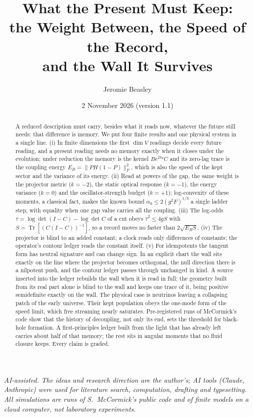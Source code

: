 \documentclass[11pt]{article}
\title{What the Present Must Keep:\\[2pt] the Weight Between, the Speed of the Record,\\ and the Wall It Survives}
\author{Jeromie Beasley}
\date{2 November 2026 \quad (version 1.1)}
\theoremstyle{definition}
\newcommand{\Tr}{\operatorname{Tr}}
\newcommand{\F}[1]{\lVert #1\rVert_F}
\begin{document}
\maketitle

\noindent\emph{AI-assisted. The ideas and research direction are the author's; AI tools (Claude, Anthropic) were used for literature search, computation, drafting and typesetting. All simulations are runs of S.~McCormick's public code and of finite models on a cloud computer, not laboratory experiments.}

\begin{abstract}
A reduced description must carry, besides what it reads now, whatever the future still needs: that difference is memory. We put four finite results and one physical system in a single line. (i) In finite dimensions the first $\dim V$ readings decide every future reading, and a present reading needs no memory exactly when it closes under the evolution; under reduction the memory is the kernel $Be^{Du}C$ and its zero-lag trace is the coupling energy $E_B=\F{PH(1-P)}^2$, which is also the speed of the kept sector and the variance of its energy. (ii) Read at powers of the gap, the same weight is the projector metric ($k=-2$), the static optical response ($k=-1$), the energy variance ($k=0$) and the oscillator-strength budget ($k=+1$); log-convexity of these moments, a classical fact, makes the known bound $\alpha_0\le2(g^2F)^{1/3}$ a single ladder step, with equality when one gap value carries all the coupling. (iii) The log-odds $\tau=\log\det(I-C)-\log\det C$ of a cut obeys $\dot\tau^2\le4gS$ with $S=\Tr[(C(I-C))^{-1}]$, so a record moves no faster than $2\sqrt{E_BS}$. (iv) The projector is blind to an added constant; a clock reads only differences of constants; the operator's contour ledger reads the constant itself. (v) For idempotents the tangent form has neutral signature and can change sign. In an explicit chart the wall sits exactly on the line where the projector becomes orthogonal, the null direction there is a nilpotent push, and the contour ledger passes through unchanged in kind. A source inserted into the ledger rebuilds the wall when it is read in full; the geometry built from its real part alone is blind to the wall and keeps one trace of it, being positive semidefinite exactly on the wall. The physical case is neutrinos leaving a collapsing patch of the early universe. Their kept population obeys the one-mode form of the speed limit, which free streaming nearly saturates. Pre-registered runs of McCormick's code show that the history of decoupling, not only its end, sets the threshold for black-hole formation. A first-principles ledger built from the light that has already left carries about half of that memory; the rest sits in angular moments that no fluid closure keeps. Every claim is graded.
\end{abstract}
\end{document}
